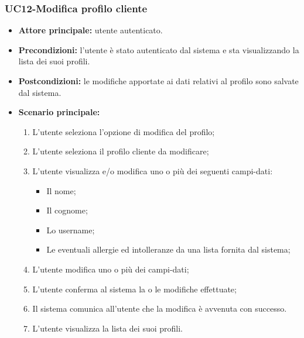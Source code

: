 \subsubsection{UC12-Modifica profilo cliente}
\begin{itemize}
\item \textbf{Attore principale:} utente autenticato.
\item \textbf{Precondizioni:} l'utente è stato autenticato dal sistema e sta visualizzando la lista dei suoi profili.
\item \textbf{Postcondizioni:} le modifiche apportate ai dati relativi al profilo sono salvate dal sistema.
\item \textbf{Scenario principale:}
\begin{enumerate}
    \item L'utente seleziona l'opzione di modifica del profilo;
    \item L'utente seleziona il profilo cliente da modificare;
    \item L'utente visualizza e/o modifica uno o più dei seguenti campi-dati:
        \begin{itemize}
            \item Il nome;
            \item Il cognome;
            \item Lo username;
            \item Le eventuali allergie ed intolleranze da una lista fornita dal sistema;
        \end{itemize}
    \item L'utente modifica uno o più dei campi-dati;
    \item L'utente conferma al sistema la o le modifiche effettuate;
    \item Il sistema comunica all'utente che la modifica è avvenuta con successo.
    \item L'utente visualizza la lista dei suoi profili.
\end{enumerate}
\end{itemize}

